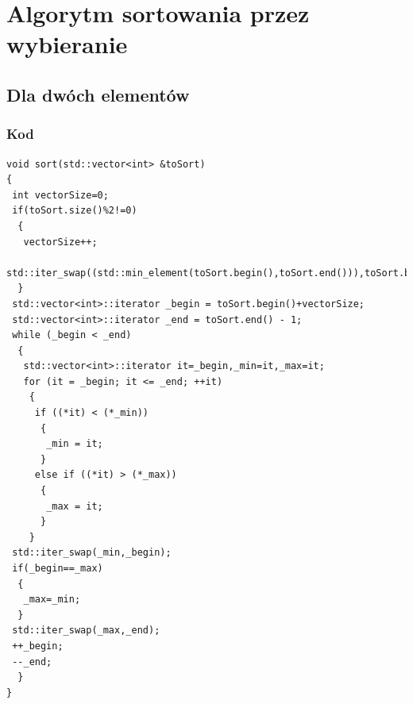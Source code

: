 \section{Algorytm sortowania przez wybieranie}
\subsection{Dla dwóch elementów}
\subsubsection*{Kod}
\begin{lstlisting}
void sort(std::vector<int> &toSort)
{
 int vectorSize=0;
 if(toSort.size()%2!=0)
  {
   vectorSize++;
   std::iter_swap((std::min_element(toSort.begin(),toSort.end())),toSort.begin());
  }
 std::vector<int>::iterator _begin = toSort.begin()+vectorSize;
 std::vector<int>::iterator _end = toSort.end() - 1;
 while (_begin < _end)
  {
   std::vector<int>::iterator it=_begin,_min=it,_max=it;
   for (it = _begin; it <= _end; ++it)
    {
     if ((*it) < (*_min))
      {
	   _min = it;
	  }
	 else if ((*it) > (*_max))
	  {
	   _max = it;
	  }
    }
 std::iter_swap(_min,_begin);
 if(_begin==_max)
  {
   _max=_min;
  }
 std::iter_swap(_max,_end);
 ++_begin;
 --_end;
  }
}
\end{lstlisting}
